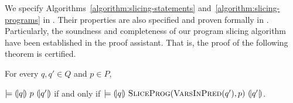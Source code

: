 We specify Algorithms~\ref{algorithm:slicing-statements}
and~\ref{algorithm:slicing-programs} in \gallina. Their properties are
also specified and proven formally in \coq. Particularly, the
soundness and completeness of our program slicing algorithm have been
established in the proof assistant. That is, the proof of the
following theorem is certified. 

\begin{theorem}
  For every $q, q' \in Q$ and $p \in P$,
  \begin{center}
  $\models {(\!|}{q}{|\!)}~{p}~{(\!|}{q'}{|\!)}$ if and only if
  $\models {(\!|}{q}{|\!)}~{\textsc{SliceProg}(\textsc{VarsInPred}(q'), p)}~{(\!|}{q'}{|\!)}$.
  \end{center}
  \label{theorem:program-slicing}
\end{theorem}